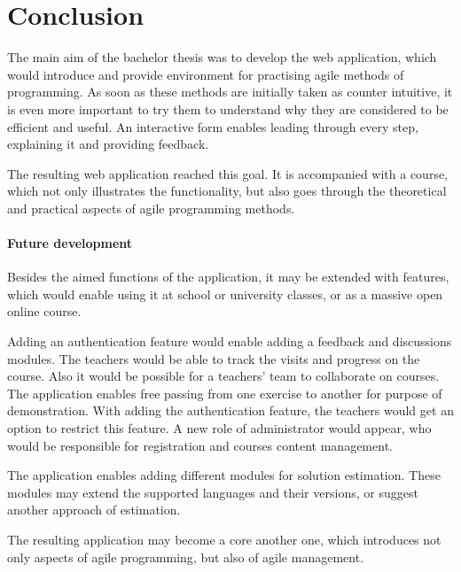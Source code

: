 \chapter*{Conclusion}  %

The main aim of the bachelor thesis was to develop the web application, which would introduce and provide environment for practising agile methods of programming. As soon as these methods are initially taken as counter intuitive, it is even more important to try them to understand why they are considered to be efficient and useful. An interactive form enables leading through every step, explaining it and providing feedback.

The resulting web application reached this goal. It is accompanied with a course, which not only illustrates the functionality, but also goes through the theoretical and practical aspects of agile programming methods.

    \subsubsection{Future development}
    Besides the aimed functions of the application, it may be extended with features, which would enable using it at school or university classes, or as a massive open online course.

    Adding an authentication feature would enable adding a feedback and discussions modules. The teachers would be able to track the visits and progress on the course. Also it would be possible for a teachers' team to collaborate on courses. The application enables free passing from one exercise to another for purpose of demonstration. With adding the authentication feature, the teachers would get an option to restrict this feature. A new role of administrator would appear, who would be responsible for registration and courses content management.
    
    The application enables adding different modules for solution estimation. These modules may extend the supported languages and their versions, or suggest another approach of estimation.
    
    The resulting application may become a core another one, which introduces not only aspects of agile programming, but also of agile management.